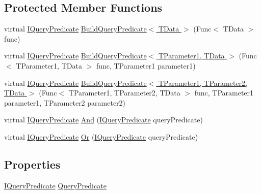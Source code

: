\subsection*{Protected Member Functions}
\begin{DoxyCompactItemize}
\item 
virtual \hyperlink{interfaceCqrs_1_1Repositories_1_1Queries_1_1IQueryPredicate}{I\+Query\+Predicate} \hyperlink{classCqrs_1_1Repositories_1_1Queries_1_1QueryStrategy_ad8d28df2576ea9669e4b02fd368ffab5}{Build\+Query\+Predicate$<$ T\+Data $>$} (Func$<$ T\+Data $>$ func)
\item 
virtual \hyperlink{interfaceCqrs_1_1Repositories_1_1Queries_1_1IQueryPredicate}{I\+Query\+Predicate} \hyperlink{classCqrs_1_1Repositories_1_1Queries_1_1QueryStrategy_a00435830d1204507b1bf515263607be0}{Build\+Query\+Predicate$<$ T\+Parameter1, T\+Data $>$} (Func$<$ T\+Parameter1, T\+Data $>$ func, T\+Parameter1 parameter1)
\item 
virtual \hyperlink{interfaceCqrs_1_1Repositories_1_1Queries_1_1IQueryPredicate}{I\+Query\+Predicate} \hyperlink{classCqrs_1_1Repositories_1_1Queries_1_1QueryStrategy_af8d1066419789fe942ebc167cd76ddfb}{Build\+Query\+Predicate$<$ T\+Parameter1, T\+Parameter2, T\+Data $>$} (Func$<$ T\+Parameter1, T\+Parameter2, T\+Data $>$ func, T\+Parameter1 parameter1, T\+Parameter2 parameter2)
\item 
virtual \hyperlink{interfaceCqrs_1_1Repositories_1_1Queries_1_1IQueryPredicate}{I\+Query\+Predicate} \hyperlink{classCqrs_1_1Repositories_1_1Queries_1_1QueryStrategy_a860b209d9e99d7de5302ef4e19d318f0}{And} (\hyperlink{interfaceCqrs_1_1Repositories_1_1Queries_1_1IQueryPredicate}{I\+Query\+Predicate} query\+Predicate)
\item 
virtual \hyperlink{interfaceCqrs_1_1Repositories_1_1Queries_1_1IQueryPredicate}{I\+Query\+Predicate} \hyperlink{classCqrs_1_1Repositories_1_1Queries_1_1QueryStrategy_a96f4657370c8cd0d20465d2855ea2fd7}{Or} (\hyperlink{interfaceCqrs_1_1Repositories_1_1Queries_1_1IQueryPredicate}{I\+Query\+Predicate} query\+Predicate)
\end{DoxyCompactItemize}
\subsection*{Properties}
\begin{DoxyCompactItemize}
\item 
\hyperlink{interfaceCqrs_1_1Repositories_1_1Queries_1_1IQueryPredicate}{I\+Query\+Predicate} \hyperlink{classCqrs_1_1Repositories_1_1Queries_1_1QueryStrategy_a45d9ad6895a7e8c404ea64abab5242ec}{Query\+Predicate}
\end{DoxyCompactItemize}


